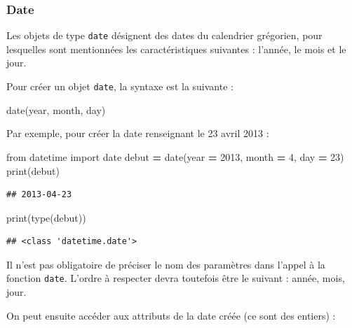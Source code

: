 \documentclass[12pt,]{book}
\newenvironment{Shaded}{\begin{snugshade}}{\end{snugshade}}
\newcommand{\DecValTok}[1]{\textcolor[rgb]{0.00,0.00,0.81}{#1}}
\newcommand{\ImportTok}[1]{#1}
\newcommand{\OperatorTok}[1]{\textcolor[rgb]{0.81,0.36,0.00}{\textbf{#1}}}
\newcommand{\BuiltInTok}[1]{#1}
\newcommand{\NormalTok}[1]{#1}
\numberwithin{equation}{section}
\numberwithin{countremarque}{section}
\let\BeginKnitrBlock\begin \let\EndKnitrBlock\end
\begin{document}
\subsubsection{Date}\label{type-date}

Les objets de type \texttt{date} désignent des dates du calendrier
grégorien, pour lesquelles sont mentionnées les caractéristiques
suivantes : l'année, le mois et le jour.

Pour créer un objet \texttt{date}, la syntaxe est la suivante :

\begin{Shaded}
\begin{Highlighting}[]
\NormalTok{date(year, month, day)}
\end{Highlighting}
\end{Shaded}

Par exemple, pour créer la date renseignant le 23 avril 2013 :

\begin{Shaded}
\begin{Highlighting}[]
\ImportTok{from}\NormalTok{ datetime }\ImportTok{import}\NormalTok{ date}
\NormalTok{debut }\OperatorTok{=}\NormalTok{ date(year }\OperatorTok{=} \DecValTok{2013}\NormalTok{, month }\OperatorTok{=} \DecValTok{4}\NormalTok{, day }\OperatorTok{=} \DecValTok{23}\NormalTok{)}
\BuiltInTok{print}\NormalTok{(debut)}
\end{Highlighting}
\end{Shaded}

\begin{lstlisting}
## 2013-04-23
\end{lstlisting}

\begin{Shaded}
\begin{Highlighting}[]
\BuiltInTok{print}\NormalTok{(}\BuiltInTok{type}\NormalTok{(debut))}
\end{Highlighting}
\end{Shaded}

\begin{lstlisting}
## <class 'datetime.date'>
\end{lstlisting}

\BeginKnitrBlock{remarque}
Il n'est pas obligatoire de préciser le nom des paramètres dans l'appel
à la fonction \texttt{date}. L'ordre à respecter devra toutefois être le
suivant : année, mois, jour.
\EndKnitrBlock{remarque}

On peut ensuite accéder aux attributs de la date créée (ce sont des
entiers) :
\end{document}

